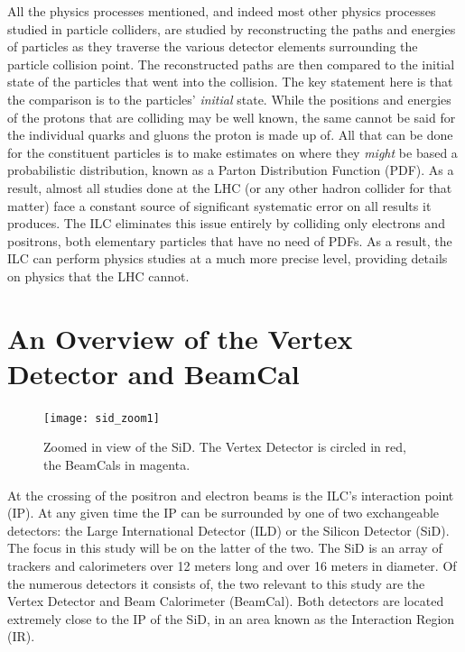 \documentclass{report}
\begin{document}
                All the physics processes mentioned, and indeed most other physics processes studied in particle colliders, are studied by reconstructing the paths and energies of particles as they traverse the various detector elements surrounding the particle collision point. The reconstructed paths are then compared to the initial state of the particles that went into the collision. The key statement here is that the comparison is to the particles' \textit{initial} state. While the positions and energies of the protons that are colliding may be well known, the same cannot be said for the individual quarks and gluons the proton is made up of. All that can be done for the constituent particles is to make estimates on where they \textit{might} be based a probabilistic distribution, known as a Parton Distribution Function (PDF). As a result, almost all studies done at the LHC (or any other hadron collider for that matter) face a constant source of significant systematic error on all results it produces. The ILC eliminates this issue entirely by colliding only electrons and positrons, both elementary particles that have no need of PDFs. As a result, the ILC can perform physics studies at a much more precise level, providing details on physics that the LHC cannot.


            \section{An Overview of the Vertex Detector and BeamCal}
                \begin{figure}[h] 
                    \texttt{[image: sid\_zoom1]}
                    \centering
                    \caption{Zoomed in view of the SiD.
                        The Vertex Detector is circled in red,
                        the BeamCals in magenta.}
                    \label{sid_zoom1}
                \end{figure}

                At the crossing of the positron and electron beams is the ILC's interaction point (IP). At any given time the IP can be surrounded by one of two exchangeable detectors: the Large International Detector (ILD) or the Silicon Detector (SiD). The focus in this study will be on the latter of the two. The SiD is an array of trackers and calorimeters over 12 meters long and over 16 meters in diameter. Of the numerous detectors it consists of, the two relevant to this study are the Vertex Detector and Beam Calorimeter (BeamCal). Both detectors are located extremely close to the IP of the SiD, in an area known as the Interaction Region (IR). 
                
\end{document}
